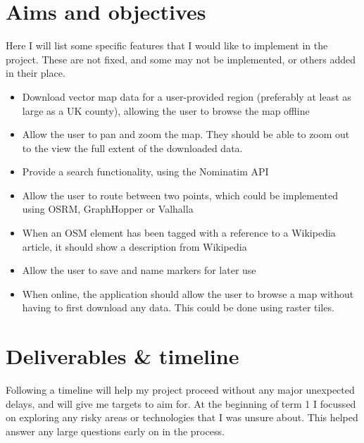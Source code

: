 \documentclass[hyphens]{final_report}
\begin{document}
\section{Aims and objectives}

Here I will list some specific features that I would like to implement in the project. These are not fixed, and some may not be implemented, or others added in their place.

\begin{itemize}
    \item Download vector map data for a user-provided region (preferably at least as large as a UK county), allowing the user to browse the map offline
    \item Allow the user to pan and zoom the map. They should be able to zoom out to the view the full extent of the downloaded data.
    \item Provide a search functionality, using the Nominatim API
    \item Allow the user to route between two points, which could be implemented using OSRM, GraphHopper or Valhalla
    \item When an OSM element has been tagged with a reference to a Wikipedia article, it should show a description from Wikipedia
    \item Allow the user to save and name markers for later use
    \item When online, the application should allow the user to browse a map without having to first download any data. This could be done using raster tiles.
\end{itemize}

\section{Deliverables \& timeline}

Following a timeline will help my project proceed without any major unexpected delays, and will give me targets to aim for. At the beginning of term 1 I focussed on exploring any risky areas or technologies that I was unsure about. This helped answer any large questions early on in the process.
\end{document}
